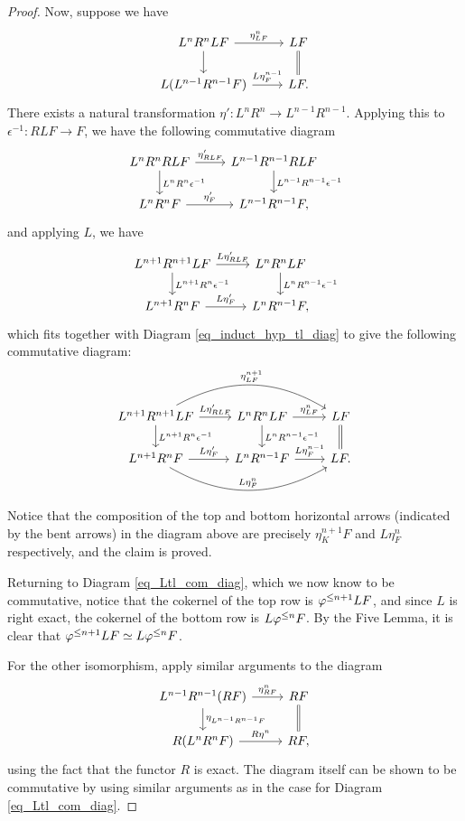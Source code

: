 \begin{proof}
Now, suppose we have
\begin{equation}\label{eq_induct_hyp_tl_diag}
\begin{tikzcd}
L^{n}R^{n}LF \arrow{r}{\eta^{n}_{LF}} \arrow{d} &
LF \arrow[equals]{d} \\
L(L^{n - 1}R^{n - 1}F) \arrow{r}{L\eta^{n - 1}_F} &
LF.
\end{tikzcd}
\end{equation}
There exists a natural transformation $\eta': L^n R^n \to 
L^{n - 1} R^{n - 1}$. Applying this to $\epsilon^{-1}: RL F \to 
F$, we have the following commutative diagram
\[
\begin{tikzcd}
L^n R^n RL F \arrow{r}{\eta'_{RLF}} 
   \arrow{d}{L^nR^n \epsilon^{-1}} &
L^{n - 1}R^{n - 1} RLF 
   \arrow{d}{L^{n - 1}R^{n - 1}\epsilon^{-1}} \\
L^nR^n F \arrow{r}{\eta'_F} &
L^{n - 1}R^{n - 1} F,
\end{tikzcd}
\]
and applying $L$, we have
\[
\begin{tikzcd}
L^{n + 1} R^{n + 1} L F \arrow{r}{L\eta'_{RLF}} 
   \arrow{d}{L^{n + 1}R^n \epsilon^{-1}} &
L^{n}R^n LF \arrow{d}{L^nR^{n - 1}\epsilon^{-1}} \\
L^{n + 1}R^n F \arrow{r}{L\eta'_F} &
L^{n}R^{n - 1} F,
\end{tikzcd}
\]
which fits together with Diagram \ref{eq_induct_hyp_tl_diag} to 
give the following commutative diagram:
\[
\begin{tikzcd}
L^{n + 1} R^{n + 1} L F \arrow{r}{L\eta'_{RLF}} 
   \arrow{d}{L^{n + 1}R^n \epsilon^{-1}}
   \arrow[bend left]{rr}{\eta^{n + 1}_{LF}} &
L^{n}R^n LF \arrow{d}{L^nR^{n - 1}\epsilon^{-1}}
   \arrow{r}{\eta^{n}_{LF}} &
LF \arrow[equals]{d} \\
L^{n + 1}R^n F \arrow{r}{L\eta'_F} 
   \arrow[bend right]{rr}{L\eta^n_F} &
L^{n}R^{n - 1} F \arrow{r}{L\eta^{n - 1}_F} &
LF.
\end{tikzcd}
\]
Notice that the composition of the top and bottom horizontal 
arrows (indicated by the bent arrows) in the diagram above are 
precisely $\eta^{n + 1}_KF$ and $L \eta^n_F$ respectively, and
the claim is proved.

Returning to Diagram \ref{eq_Ltl_com_diag}, which we now know to 
be commutative, notice that the cokernel of the top row is 
$\varphi^{\leq n + 1}LF$, and since $L$ is right exact, the cokernel of 
the bottom row is $L\varphi^{\leq n} F$. By the Five Lemma, it is clear 
that $\varphi^{\leq n + 1}LF \simeq L\varphi^{\leq n} F$.

For the other isomorphism, apply similar arguments to the
diagram
\[
\begin{tikzcd}
L^{n - 1}R^{n - 1}(RF) \arrow{r}{\eta^n_{RF}} 
   \arrow{d}{\eta_{L^{n - 1}R^{n - 1}F}} &
RF \arrow[equals]{d} \\
R (L^n R^n F) \arrow{r}{R \eta^n} &
RF,
\end{tikzcd}
\]
using the fact that the functor $R$ is exact. The diagram itself
can be shown to be commutative by using similar arguments as in
the case for Diagram \ref{eq_Ltl_com_diag}.
\end{proof}

